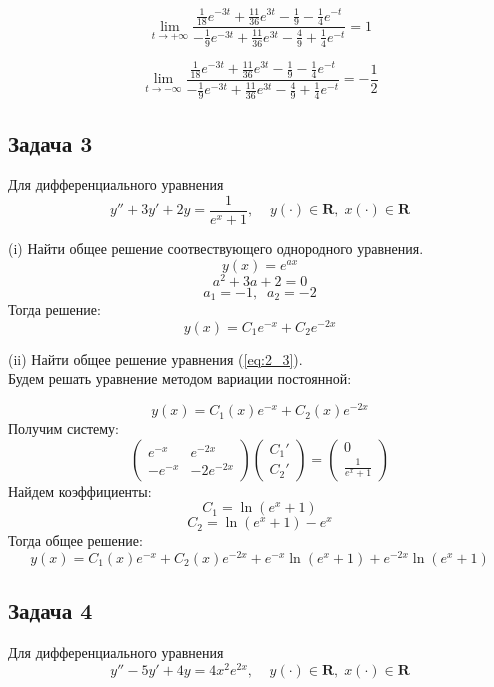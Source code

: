 \documentclass[a4paper, 12pt]{article}
\begin{document}
\[\lim_{t\rightarrow+\infty}\frac{\frac 1 {18}e^{-3t}+\frac{11} {36} e^{3t}- \frac 1 9 -\frac 1 4 e^{-t}}{-\frac 1 9 e^{-3t}+\frac{11}{36}e^{3t}-\frac 4 9 + \frac 1 4 e^{-t}}= 1\]

\[\lim_{t\rightarrow-\infty}\frac{\frac 1 {18}e^{-3t}+\frac{11} {36} e^{3t}- \frac 1 9 -\frac 1 4 e^{-t}}{-\frac 1 9 e^{-3t}+\frac{11}{36}e^{3t}-\frac 4 9 + \frac 1 4 e^{-t}}=-\frac 1 2\]

	\subsection*{Задача 3}
Для дифференциального уравнения 
\begin{equation}
y''+3y'+2y=\frac {1}{e^x+1}, \;\;\;\; y(\cdot)\in \textbf{R},\; x(\cdot)\in \textbf{R}
\label{eq:2_3}
\end{equation}

(i) Найти общее решение соотвествующего однородного уравнения.\\
\[y(x) = e^{ax}\]
\[a^2+3a+2=0\]
\[a_1 = -1,\;\; a_2 = -2\]
Тогда решение:
\[y(x)=C_1e^{-x}+C_2e^{-2x}\]

(ii) Найти общее решение уравнения (\ref{eq:2_3}).\\
Будем решать уравнение методом вариации постоянной:

\[y(x)= C_1(x)e^{-x}+C_2(x)e^{-2x}\]
Получим систему:
\[ \left(
\begin{array}{cc}
e^{-x} & e^{-2x} \\
-e^{-x} & -2e^{-2x}
\end{array}
\right) \left(
\begin{array}{c}
C_1' \\
C_2'
\end{array} 
\right)= \left(
\begin{array}{c}
0 \\
\frac {1}{e^x+1}
\end{array}
\right) \]
Найдем коэффициенты:
\[C_1 = \ln (e^x+1)\]
\[C_2 = \ln (e^x+1)-e^x\]
Тогда общее решение:
\[y(x)= C_1(x)e^{-x}+C_2(x)e^{-2x}+e^{-x} \ln (e^x+1)+e^{-2x}\ln (e^x+1)\]




	\subsection* {Задача 4}

Для дифференциального уравнения
\begin{equation}
y''-5y'+4y=4x^2e^{2x}, \;\;\;\; y(\cdot)\in \textbf{R}, \; x(\cdot)\in \textbf{R}
\label{eq:2_4}
\end{equation}
\end{document}
